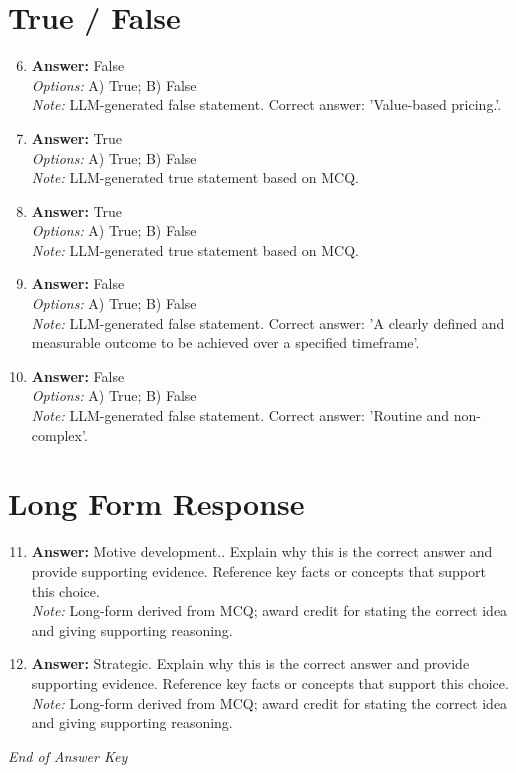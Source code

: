 \documentclass[12pt]{article}
\begin{document}
\section*{True / False}
\begin{enumerate}[label=\arabic*.]
\setcounter{enumi}{5}
\item \textbf{Answer:} False
\\ \textit{Options:} A) True; B) False
\\ \textit{Note:} LLM-generated false statement. Correct answer: 'Value-based pricing.'.
\item \textbf{Answer:} True
\\ \textit{Options:} A) True; B) False
\\ \textit{Note:} LLM-generated true statement based on MCQ.
\item \textbf{Answer:} True
\\ \textit{Options:} A) True; B) False
\\ \textit{Note:} LLM-generated true statement based on MCQ.
\item \textbf{Answer:} False
\\ \textit{Options:} A) True; B) False
\\ \textit{Note:} LLM-generated false statement. Correct answer: 'A clearly defined and measurable outcome to be achieved over a specified timeframe'.
\item \textbf{Answer:} False
\\ \textit{Options:} A) True; B) False
\\ \textit{Note:} LLM-generated false statement. Correct answer: 'Routine and non-complex'.
\end{enumerate}

\section*{Long Form Response}
\begin{enumerate}[label=\arabic*.]
\setcounter{enumi}{10}
\item \textbf{Answer:} Motive development.. Explain why this is the correct answer and provide supporting evidence. Reference key facts or concepts that support this choice.
\\ \textit{Note:} Long-form derived from MCQ; award credit for stating the correct idea and giving supporting reasoning.
\item \textbf{Answer:} Strategic. Explain why this is the correct answer and provide supporting evidence. Reference key facts or concepts that support this choice.
\\ \textit{Note:} Long-form derived from MCQ; award credit for stating the correct idea and giving supporting reasoning.
\end{enumerate}

\vfill
\noindent\textit{End of Answer Key}
\end{document}
